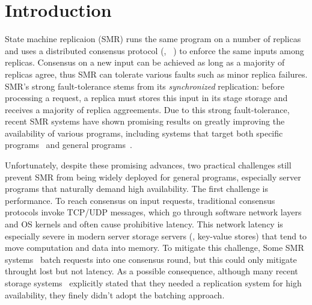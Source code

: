 \section{Introduction} \label{sec:intro}

State machine replicaion (SMR) runs the same program on a 
number of replicas and uses a distributed consensus protocol (\eg, 
\paxos~\cite{crane:sosp15}) to enforce the same inputs among 
replicas. Consensus on a new input can be achieved as long as a majority of 
replicas agree, thus SMR can tolerate various faults such as minor replica 
failures. SMR's strong fault-tolerance stems from its \emph{synchronized} 
replication: before processing a request, a replica must stores this input in 
its stage storage and receives a majority of replica aggreements. Due to this 
strong fault-tolerance, recent SMR systems have shown promising results on 
greatly improving the availability of various programs, including systems that 
target both specific programs~\cite{chubby:osdi, zookeeper} and general 
programs~\cite{crane:sosp15,eve:osdi12,rex:eurosys14}.

Unfortunately, despite these promising advances, two practical challenges still 
prevent SMR from being widely deployed for general programs, especially 
server programs that naturally demand high availability. The first challenge is 
performance. To reach consensus on input requests, traditional consensus 
protocols invoke TCP/UDP messages, which go through software network layers 
and OS kernels and often cause prohibitive latency. This network latency is 
especially severe in modern server storage servers (\eg, key-value stores) that 
tend to move computation and data into memory. To mitigate this challenge, Some 
SMR systems~\cite{calvin:sigmod12,rex:eusorys14} batch requests into one 
consensus round, but this could only mitigate throught lost but not latency. As 
a possible consequence, although many recent storage systems~\cite{drtm} 
explicitly stated that they needed a replication system for high availability, 
they finely didn't adopt the batching approach.

